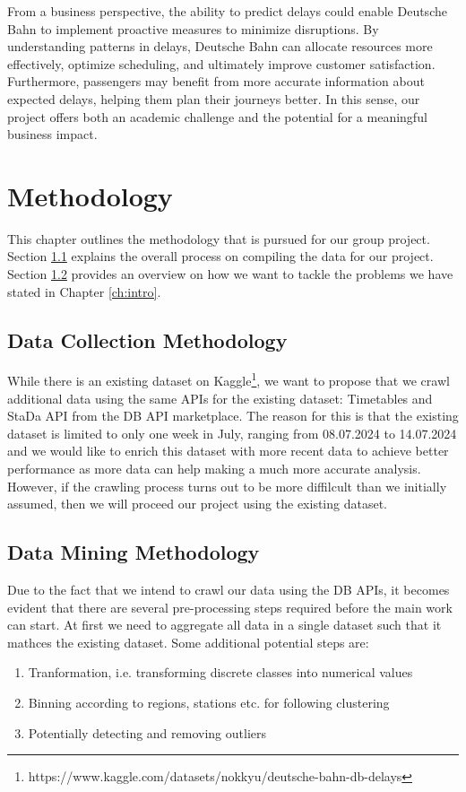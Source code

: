 \documentclass[a4paper,oneside,bibliography=totoc]{scrbook}
\begin{document}
    From a business perspective, the ability to predict delays could enable Deutsche Bahn to implement proactive measures to minimize disruptions. By understanding patterns in delays, Deutsche Bahn can allocate resources more effectively, optimize scheduling, and ultimately improve customer satisfaction. Furthermore, passengers may benefit from more accurate information about expected delays, helping them plan their journeys better. In this sense, our project offers both an academic challenge and the potential for a meaningful business impact.


    \chapter{Methodology}
    \label{ch:methodology}
    This chapter outlines the methodology that is pursued for our group project. Section \ref{sec:dataset} explains the overall process on compiling the data for our project. Section \ref{sec:data-mining-methodology} provides an overview on how we want to tackle the problems we have stated in Chapter \ref{ch:intro}.


    \section{Data Collection Methodology}\label{sec:dataset}
    While there is an existing dataset on Kaggle\footnote{https://www.kaggle.com/datasets/nokkyu/deutsche-bahn-db-delays}, we want to propose that we crawl additional data using the same APIs for the existing dataset: Timetables and StaDa API from the DB API marketplace.
    The reason for this is that the existing dataset is limited to only one week in July, ranging from 08.07.2024 to 14.07.2024 and we would like to enrich this dataset with more recent data to achieve better performance as more data can help making a much more accurate analysis.
    However, if the crawling process turns out to be more diffilcult than we initially assumed, then we will proceed our project using the existing dataset.


    \section{Data Mining Methodology}\label{sec:data-mining-methodology}
    Due to the fact that we intend to crawl our data using the DB APIs, it becomes evident that there are several pre-processing steps required before the main work can start. At first we need to aggregate all data in a single dataset such that it mathces the existing dataset.
    Some additional potential steps are:
    \begin{enumerate}
        \item Tranformation, i.e. transforming discrete classes into numerical values
        \item Binning according to regions, stations etc. for following clustering
        \item Potentially detecting and removing outliers
    \end{enumerate}
\end{document}
